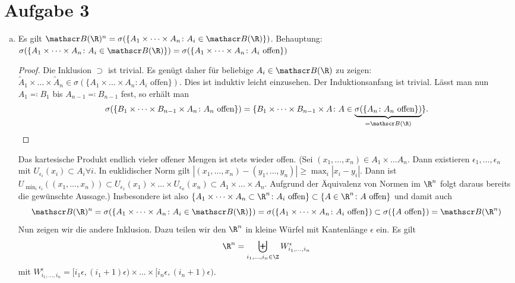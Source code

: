 \documentclass{article}
\begin{document}
    \section*{Aufgabe 3}
    \begin{enumerate}[(a)]
        \item Es gilt $\mathscr B(\R)^n = \sigma(\{A_1 \times \dots \times A_n\colon A_i \in \mathscr B(\R)\})$.
        Behauptung: $\sigma(\{A_1 \times \dots \times A_n\colon A_i \in \mathscr B(\R)\}) = \sigma(\{A_1 \times \dots \times A_n\colon A_i \text{ offen}\})$
        \begin{proof}
            Die Inklusion $\supset$ ist trivial. Es genügt daher für beliebige $A_i \in \mathscr B(\R)$ zu zeigen: $\tilde A_1 \times \dots \times \tilde A_n \in \sigma(\{A_1 \times \dots \times A_n\colon A_i \text{ offen}\})$. Dies ist induktiv leicht einzusehen. Der Induktionsanfang ist trivial. Lässt man nun $A_1 \eqqcolon B_1$ bis $A_{n-1} \eqqcolon B_{n-1}$ fest, so erhält man 
            \[
                \sigma(\{B_1 \times \dots \times B_{n-1} \times A_n\colon A_n \text{ offen}\}) = \{B_1 \times \dots \times B_{n-1} \times A\colon A \in \underbrace{\sigma(\{A_n\colon A_n \text{ offen}\})}_{= \mathscr B(\R)}\}.
            \]
        \end{proof}
        Das kartesische Produkt endlich vieler offener Mengen ist stets wieder offen. (Sei $(x_1, \dots, x_n) \in A_1\times \dots A_n$. Dann existieren $\epsilon_1, \dots, \epsilon_n$ mit $U_{\epsilon_i}(x_i) \subset A_i \forall i$. In euklidischer Norm gilt $|(x_1, \dots, x_n) - (y_1, \dots, y_n)| \geq \max_i |x_i - y_i|$. Dann ist $U_{\min_i \epsilon_i}((x_1, \dots, x_n)) \subset U_{\epsilon_1}(x_1) \times \dots \times U_{\epsilon_n}(x_n) \subset A_1 \times \dots \times A_n$. Aufgrund der Äquivalenz von Normen im $\R^n$ folgt daraus bereits die gewünschte Aussage.)
        Insbesondere ist also $\{A_1 \times \dots \times A_n \subset \R^n\colon A_i \text{ offen}\} \subset \{A \in \R^n\colon A \text{ offen}\}$ und damit auch 
        \[ 
            \mathscr B(\R)^n = \sigma(\{A_1 \times \dots \times A_n\colon A_i \in \mathscr B(\R)\}) = \sigma(\{A_1 \times \dots \times A_n\colon A_i \text{ offen}\}) \subset \sigma(\{A \text{ offen}\}) = \mathscr B(\R^n)
        \]
        Nun zeigen wir die andere Inklusion. Dazu teilen wir den $\R^n$ in kleine Würfel mit Kantenlänge $\epsilon$ ein. Es gilt
        \[
            \R^n = \biguplus_{i_1, \dots, i_n \in \Z} W_{i_1, \dots, i_n}^\epsilon
        \]
        mit $W_{i_1, \dots, i_n}^\epsilon = [i_1\epsilon, (i_1 +1)\epsilon) \times \dots \times [i_n\epsilon, (i_n+1)\epsilon)$.

\end{enumerate}
\end{document}
